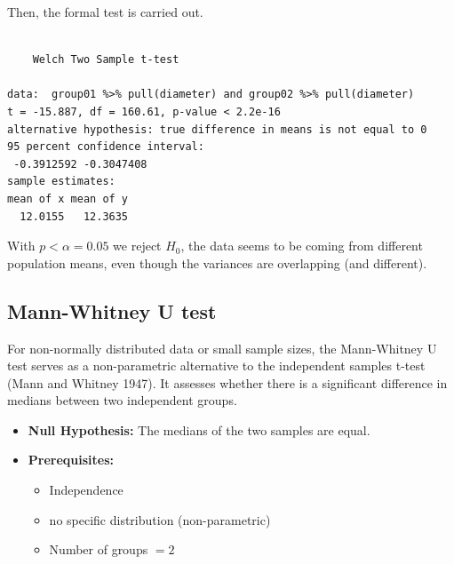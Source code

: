 \documentclass[
  a4paper,
]{scrbook}
\providecommand{\tightlist}{%
  \setlength{\itemsep}{0pt}\setlength{\parskip}{0pt}}\usepackage{longtable,booktabs,array}
\begin{document}
Then, the formal test is carried out.

\begin{verbatim}

    Welch Two Sample t-test

data:  group01 %>% pull(diameter) and group02 %>% pull(diameter)
t = -15.887, df = 160.61, p-value < 2.2e-16
alternative hypothesis: true difference in means is not equal to 0
95 percent confidence interval:
 -0.3912592 -0.3047408
sample estimates:
mean of x mean of y 
  12.0155   12.3635 
\end{verbatim}

With \(p<\alpha = 0.05\) we reject \(H_0\), the data seems to be coming
from different population means, even though the variances are
overlapping (and different).

\subsection{Mann-Whitney U test}\label{mann-whitney-u-test}

For non-normally distributed data or small sample sizes, the
Mann-Whitney U test serves as a non-parametric alternative to the
independent samples t-test (Mann and Whitney 1947). It assesses whether
there is a significant difference in medians between two independent
groups.

\begin{itemize}
\tightlist
\item
  \textbf{Null Hypothesis:} The medians of the two samples are equal.
\item
  \textbf{Prerequisites:}

  \begin{itemize}
  \tightlist
  \item
    Independence
  \item
    no specific distribution (non-parametric)
  \item
    Number of groups \(=2\)
  \end{itemize}
\end{itemize}
\end{document}
